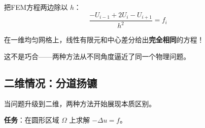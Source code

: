 \vspace{0.5cm}
把FEM方程两边除以 $h$：
\[
\frac{-U_{i-1} + 2U_i - U_{i+1}}{h^2} = f_i
\]

\begin{insightbox}
在一维均匀网格上，线性有限元和中心差分给出\textbf{完全相同}的方程！

这不是巧合——两种方法从不同角度逼近了同一个物理问题。
\end{insightbox}



\subsection{二维情况：分道扬镳}

当问题升级到二维，两种方法开始展现本质区别。

\textbf{任务}：在圆形区域 $\Omega$ 上求解 $-\Delta u = f$。

